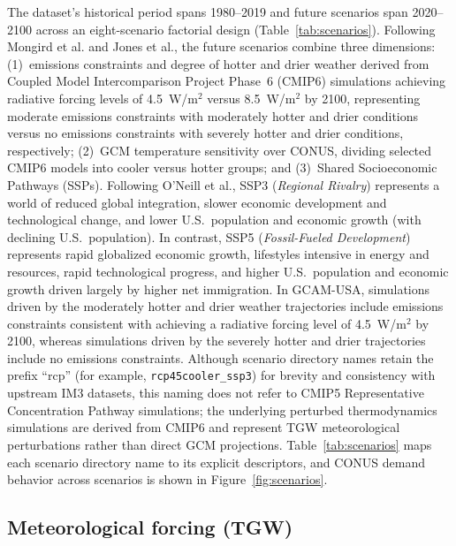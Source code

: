 \documentclass[fleqn,10pt]{wlscirep}
\begin{document}
The dataset's historical period spans 1980--2019 and future scenarios span 2020--2100 across an eight-scenario factorial design\cite{Zhao_gcamusa_water,Zhao2024,Mongird2025CERF} (Table~\ref{tab:scenarios}). Following Mongird et al.\cite{Mongird2025CERF} and Jones et al.\cite{Jones2023TGW}, the future scenarios combine three dimensions: (1)~emissions constraints and degree of hotter and drier weather derived from Coupled Model Intercomparison Project Phase~6 (CMIP6) simulations achieving radiative forcing levels of 4.5~W/m$^2$ versus 8.5~W/m$^2$ by 2100, representing moderate emissions constraints with moderately hotter and drier conditions versus no emissions constraints with severely hotter and drier conditions, respectively; (2)~GCM temperature sensitivity over CONUS, dividing selected CMIP6 models into cooler versus hotter groups; and (3)~Shared Socioeconomic Pathways (SSPs)\cite{ONeill2017SSP}. Following O'Neill et al.\cite{ONeill2017SSP}, SSP3 (\textit{Regional Rivalry}) represents a world of reduced global integration, slower economic development and technological change, and lower U.S.\ population and economic growth (with declining U.S.\ population). In contrast, SSP5 (\textit{Fossil-Fueled Development}) represents rapid globalized economic growth, lifestyles intensive in energy and resources, rapid technological progress, and higher U.S.\ population and economic growth driven largely by higher net immigration. In GCAM-USA, simulations driven by the moderately hotter and drier weather trajectories include emissions constraints consistent with achieving a radiative forcing level of 4.5~W/m$^2$ by 2100, whereas simulations driven by the severely hotter and drier trajectories include no emissions constraints\cite{Mongird2025CERF}. Although scenario directory names retain the prefix ``rcp'' (for example, \texttt{rcp45cooler\_ssp3}) for brevity and consistency with upstream IM3 datasets, this naming does not refer to CMIP5 Representative Concentration Pathway simulations; the underlying perturbed thermodynamics simulations are derived from CMIP6 and represent TGW meteorological perturbations rather than direct GCM projections\cite{Jones2023TGW,Mongird2025CERF}. Table~\ref{tab:scenarios} maps each scenario directory name to its explicit descriptors, and CONUS demand behavior across scenarios is shown in Figure~\ref{fig:scenarios}.

\subsection*{Meteorological forcing (TGW)}
\end{document}
